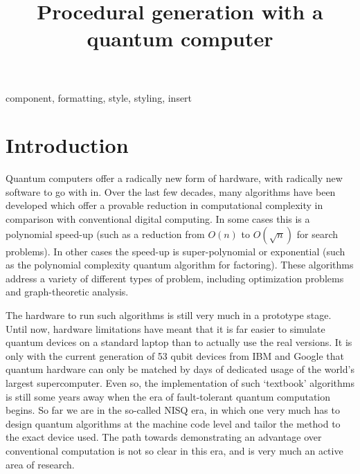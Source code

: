 \documentclass[conference]{IEEEtran}
\begin{document}
\title{Procedural generation with a quantum computer
}



\author{
}

\maketitle

\begin{abstract}

\end{abstract}

\begin{IEEEkeywords}
component, formatting, style, styling, insert
\end{IEEEkeywords}

\section{Introduction}

Quantum computers offer a radically new form of hardware, with radically new software to go with in. Over the last few decades, many algorithms have been developed which offer a provable reduction in computational complexity in comparison with conventional digital computing. In some cases this is a polynomial speed-up (such as a reduction from $O(n)$ to $O(\sqrt{n})$ for search problems). In other cases the speed-up is super-polynomial or exponential (such as the polynomial complexity quantum algorithm for factoring). These algorithms address a variety of different types of problem, including optimization problems and graph-theoretic analysis.

The hardware to run such algorithms is still very much in a prototype stage. Until now, hardware limitations have meant that it is far easier to simulate quantum devices on a standard laptop than to actually use the real versions. It is only with the current generation of 53 qubit devices from IBM and Google that quantum hardware can only be matched by days of dedicated usage of the world’s largest supercomputer. Even so, the implementation of such ‘textbook’ algorithms is still some years away when the era of fault-tolerant quantum computation begins. So far we are in the so-called NISQ era, in which one very much has to design quantum algorithms at the machine code level and tailor the method to the exact device used. The path towards demonstrating an advantage over conventional computation is not so clear in this era, and is very much an active area of research.
\end{document}
